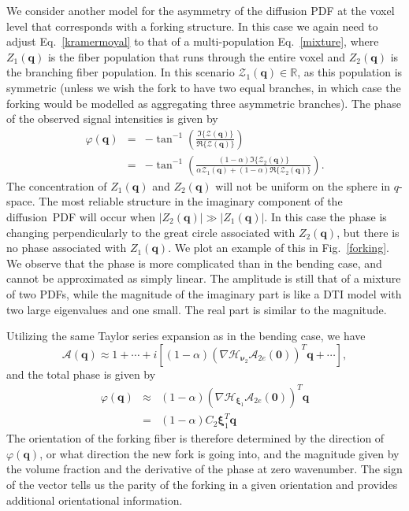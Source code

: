 \documentclass[authoryear,preprint,12pt]{elsarticle}
\newcommand{\q}{\mathbf{q}}
\newcommand{\cA}{\mathcal{A}}
\newcommand{\cH}{\mathcal{H}}
\newcommand{\bbR}{\mathbb{R}}
\newcommand{\cZ}{\mathcal{Z}}
\newcommand{\bld}[1]{\mathbf{#1}}
\newcommand{\bs}[1]{\boldsymbol{#1}}
\begin{document}
We consider another model for the asymmetry of the diffusion PDF at
the voxel level that corresponds with a forking structure.  In this
case we again need to adjust Eq.~\eqref{kramermoyal} to that of a
multi-population Eq.~\eqref{mixture},
where $Z_1(\q)$ is the fiber population that runs through the entire
voxel and $Z_2(\q)$ is the branching fiber population.  In this
scenario $\cZ_1(\q)\in\bbR$, as this population is symmetric (unless
we wish the fork to have two equal branches, in which case the forking
would be modelled as aggregating three asymmetric branches).  The
phase of the observed signal intensities is given by
\begin{eqnarray}
  \varphi(\q) &=& -\tan^{-1}
  \left(\frac{\Im\{\cZ(\q)\}}{\Re\{\cZ(\q)\}}\right)\\ &=& -\tan^{-1}
  \left(\frac{(1-\alpha)\Im\{\cZ_2(\q)\}}
       {\alpha\cZ_1(\q)+(1-\alpha)\Re\{\cZ_2(\q)\}}\right).
\end{eqnarray}
The concentration of $Z_1(\q)$ and $Z_2(\q)$ will not be uniform on
the sphere in $q$-space.  The most reliable structure in the imaginary
component of the diffusion~PDF will occur when
$|Z_2(\q)|\gg|Z_1(\q)|$.  In this case the phase is changing
perpendicularly to the great circle associated with $Z_2(\q)$, but
there is no phase associated with $Z_1(\q)$.  We plot an example of
this in Fig.~\ref{forking}.  We observe that the phase is more
complicated than in the bending case, and cannot be approximated as
simply linear. The amplitude is still that of a mixture of two PDFs,
while the magnitude of the imaginary part is like a DTI model with two
large eigenvalues and one small. The real part is similar to the
magnitude.

Utilizing the same Taylor series expansion as in the bending case, we
have
\begin{equation}
  \nonumber
  \cA(\q) \approx 1 + \cdots + i \left[(1-\alpha)
  \left(\nabla\cH_{\bs\nu_2}\cA_{2e}(\bld{0})\right)^T\q +
  \cdots\right], 
\end{equation}
and the total phase is given by
\begin{eqnarray}
  \varphi(\q) &\approx& (1-\alpha) \left(\nabla\cH_{\bs\xi_1}
   \cA_{2e}(\bld{0})\right)^T\q\\ 
   &=& (1-\alpha) C_2 \bs\xi_1^T \q
\end{eqnarray}
The orientation of the forking fiber is therefore determined by the
direction of $\varphi(\q)$, or what direction the new fork is going
into, and the magnitude given by the volume fraction and the
derivative of the phase at zero wavenumber.  The sign of the vector
tells us the parity of the forking in a given orientation and provides
additional orientational information.
\end{document}
